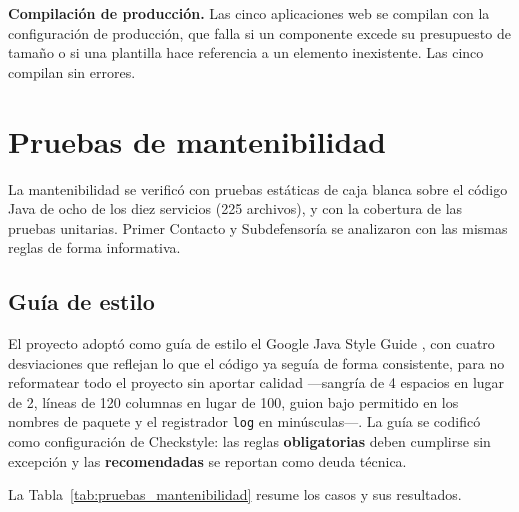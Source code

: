 	\textbf{Compilación de producción.} Las cinco aplicaciones web se compilan con la configuración de
	producción, que falla si un componente excede su presupuesto de tamaño o si una plantilla hace
	referencia a un elemento inexistente. Las cinco compilan sin errores.

	\section{Pruebas de mantenibilidad}
	\label{sec:pruebas_mantenibilidad}
	La mantenibilidad se verificó con pruebas estáticas de caja blanca sobre el código Java de ocho de
	los diez servicios (225 archivos), y con la cobertura de las pruebas unitarias. Primer Contacto y
	Subdefensoría se analizaron con las mismas reglas de forma informativa.

	\subsection{Guía de estilo}
	El proyecto adoptó como guía de estilo el Google Java Style Guide \cite{google_java_style}, con cuatro
	desviaciones que reflejan lo que el código ya seguía de forma consistente, para no reformatear todo
	el proyecto sin aportar calidad ---sangría de 4 espacios en lugar de 2, líneas de 120 columnas en lugar de 100, guion bajo
	permitido en los nombres de paquete y el registrador \texttt{log} en minúsculas---. La guía se codificó como
	configuración de Checkstyle: las reglas \textbf{obligatorias} deben cumplirse sin excepción y las
	\textbf{recomendadas} se reportan como deuda técnica.



	La Tabla~\ref{tab:pruebas_mantenibilidad} resume los casos y sus resultados.

